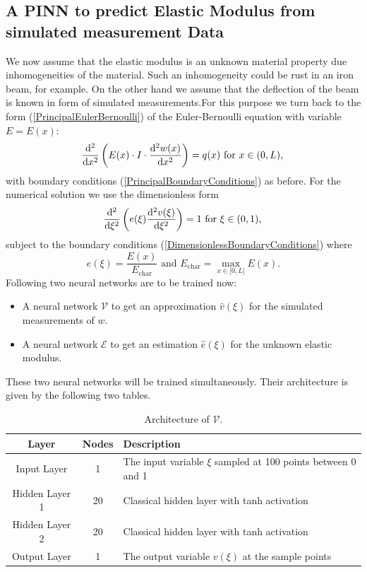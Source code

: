 \documentclass[a4paper,11pt]{article}
\begin{document}
\subsection*{A PINN to predict Elastic Modulus from simulated measurement Data}
We now assume that the elastic modulus is an unknown material property due inhomogeneities of the material. Such an inhomogeneity could be rust in an iron beam, for example. On the other hand we assume that the deflection of the beam is known in form of simulated measurements.For this purpose we turn back to the form (\ref{PrincipalEulerBernoulli}) of the Euler-Bernoulli equation with variable $E = E(x) $:
$$
\frac{\mathrm{d}^2}{\mathrm{d}x^2} \left( E(x)\cdot I \cdot \frac{\mathrm{d}^2 w(x)}{\mathrm{d}x^2} \right) = q(x) \text{ for } x \in (0,L),\\
$$
with boundary conditions (\ref{PrincipalBoundaryConditions}) as before. For the numerical solution we use the dimensionless form
\begin{equation} \label{DimensionlessEulerBernoulli}
\frac{\mathrm{d}^2}{\mathrm{d}\xi^2}\left( e(\xi ) \frac{\mathrm{d}^2 v(\xi)}{\mathrm{d}\xi^2} \right)  = 1 \text{ for } \xi \in (0,1),\\
\end{equation}
subject to the boundary conditions (\ref{DimensionlessBoundaryConditions}) where
\begin{equation*}
e(\xi ) = \frac{E( x ) }{E_{\operatorname{char}}}\text{ and } E_{\operatorname{char}} = \operatorname{max}_{x\in \lbrack 0, L \rbrack } E(x) .
\end{equation*}
Following \cite{teloli2024solving} two neural networks are to be trained now:
\begin{itemize}
\item
A neural network $\mathscr{V}$ to get an approximation $\hat{v} (\xi ) $ for the simulated measurements of $w$.
\item
A neural network $\mathscr{E}$ to get an estimation $\hat{e} (\xi) $ for the unknown elastic modulus.
\end{itemize}
These two neural networks will be trained simultaneously. Their architecture is given by the following two tables.
\begin{table}[h!]
\centering
\begin{tabular}{ccl}
\toprule
\textbf{Layer} & \textbf{Nodes} & \textbf{Description}\\
\midrule
Input Layer & 1 & The input variable $\xi $ sampled at 100 points between 0 and 1\\
Hidden Layer 1 & 20 & Classical hidden layer with tanh activation\\
Hidden Layer  2& 20 & Classical hidden layer with tanh activation\\
Output Layer & 1 & The output variable $v(\xi ) $ at the sample points\\
\bottomrule
\end{tabular}
\caption{Architecture of $\mathscr{V}$.}
\end{table}
\end{document}
